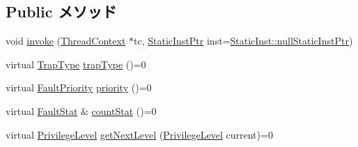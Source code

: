 \subsection*{Public メソッド}
\begin{DoxyCompactItemize}
\item 
void \hyperlink{classSparcISA_1_1SparcFaultBase_a2bd783b42262278d41157d428e1f8d6f}{invoke} (\hyperlink{classThreadContext}{ThreadContext} $\ast$tc, \hyperlink{classRefCountingPtr}{StaticInstPtr} inst=\hyperlink{classStaticInst_aa793d9793af735f09096369fb17567b6}{StaticInst::nullStaticInstPtr})
\item 
virtual \hyperlink{namespaceSparcISA_aabeb6cc11127ef5b6ebc776bfc5fb95b}{TrapType} \hyperlink{classSparcISA_1_1SparcFaultBase_a0950271648d599cac74123f9626ef7d2}{trapType} ()=0
\item 
virtual \hyperlink{namespaceSparcISA_ab4ef46911de05ddf45ea58ee440ff324}{FaultPriority} \hyperlink{classSparcISA_1_1SparcFaultBase_a18440b8fb3a4faf5a2dc397c3c2d19c4}{priority} ()=0
\item 
virtual \hyperlink{classStats_1_1Scalar}{FaultStat} \& \hyperlink{classSparcISA_1_1SparcFaultBase_a5d92ccd11b5cd6b04f02bd0a088b776c}{countStat} ()=0
\item 
virtual \hyperlink{classSparcISA_1_1SparcFaultBase_a4cf6b4de13e22b76c2be9d329d8a9b1a}{PrivilegeLevel} \hyperlink{classSparcISA_1_1SparcFaultBase_abbea6b59bcf7fbc89628c049aa7cf670}{getNextLevel} (\hyperlink{classSparcISA_1_1SparcFaultBase_a4cf6b4de13e22b76c2be9d329d8a9b1a}{PrivilegeLevel} current)=0
\end{DoxyCompactItemize}


